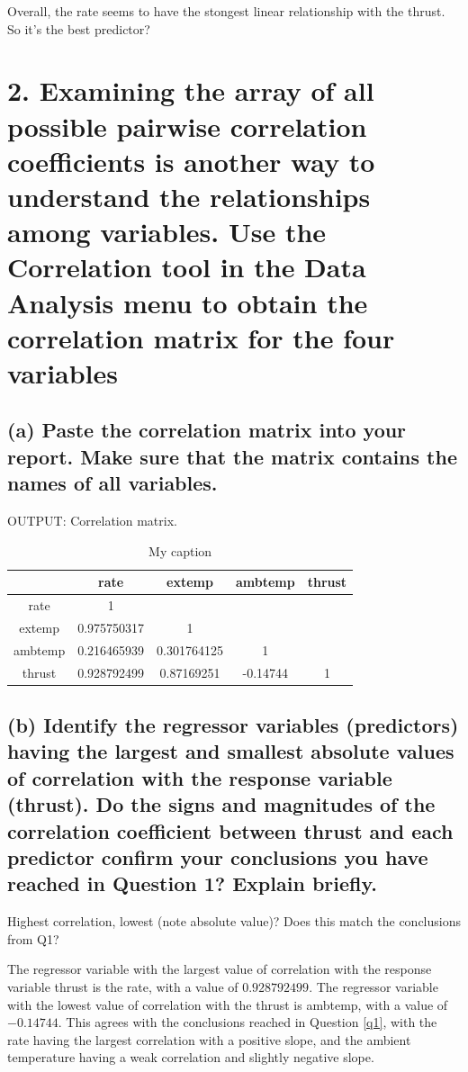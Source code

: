 \documentclass[letterpaper]{article}
\begin{document}
Overall, the rate seems to have the stongest linear relationship with the thrust.
So it's the best predictor?

\section{2.	Examining the array of all possible pairwise correlation coefficients is another way to understand the relationships among variables. Use the Correlation tool in the Data Analysis menu to obtain the correlation matrix for the four variables}

\subsection{(a)	Paste the correlation matrix into your report. Make sure that the matrix contains the names of all variables.}
OUTPUT: Correlation matrix.

\begin{table}[H]
 \centering
 \begin{tabular}{c|c|c|c|c|}
          & rate        & extemp      & ambtemp  & thrust \\ \hline
  rate    & 1           &             &          &        \\ \hline
  extemp  & 0.975750317 & 1           &          &        \\ \hline
  ambtemp & 0.216465939 & 0.301764125 & 1        &        \\ \hline
  thrust  & 0.928792499 & 0.87169251  & -0.14744 & 1      \\ \hline
 \end{tabular}
 \caption{My caption}
 \label{my-label}
\end{table}

\subsection{(b)	Identify the regressor variables (predictors) having the largest and smallest absolute values of correlation with the response variable (thrust). Do the signs and magnitudes of the correlation coefficient between thrust and each predictor confirm your conclusions you have reached in Question 1? Explain briefly.}
Highest correlation, lowest (note absolute value)? Does this
match the conclusions from Q1?

The regressor variable with the largest value of correlation with the response
variable thrust is the rate, with a value of $0.928792499$.
The regressor variable with the lowest value of correlation with the thrust
is ambtemp, with a value of $-0.14744$.
This agrees with the conclusions reached in Question \ref{q1}, with
the rate having the largest correlation with a positive slope, and the
ambient temperature having a weak correlation and slightly negative slope.
\end{document}
